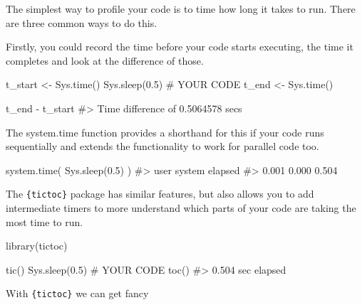 \documentclass[
  letterpaper,
  DIV=11,
  numbers=noendperiod]{scrreprt}
\newenvironment{Shaded}{\begin{snugshade}}{\end{snugshade}}
\newcommand{\CommentTok}[1]{\textcolor[rgb]{0.37,0.37,0.37}{#1}}
\newcommand{\FloatTok}[1]{\textcolor[rgb]{0.68,0.00,0.00}{#1}}
\newcommand{\FunctionTok}[1]{\textcolor[rgb]{0.28,0.35,0.67}{#1}}
\newcommand{\NormalTok}[1]{\textcolor[rgb]{0.00,0.23,0.31}{#1}}
\newcommand{\OtherTok}[1]{\textcolor[rgb]{0.00,0.23,0.31}{#1}}
\newcommand{\SpecialCharTok}[1]{\textcolor[rgb]{0.37,0.37,0.37}{#1}}
\begin{document}
The simplest way to profile your code is to time how long it takes to
run. There are three common ways to do this.

Firstly, you could record the time before your code starts executing,
the time it completes and look at the difference of those.

\begin{Shaded}
\begin{Highlighting}[]
\NormalTok{t\_start }\OtherTok{\textless{}{-}} \FunctionTok{Sys.time}\NormalTok{()}
\FunctionTok{Sys.sleep}\NormalTok{(}\FloatTok{0.5}\NormalTok{) }\CommentTok{\# YOUR CODE}
\NormalTok{t\_end }\OtherTok{\textless{}{-}} \FunctionTok{Sys.time}\NormalTok{()}

\NormalTok{t\_end }\SpecialCharTok{{-}}\NormalTok{ t\_start}
\CommentTok{\#\textgreater{} Time difference of 0.5064578 secs}
\end{Highlighting}
\end{Shaded}

The system.time function provides a shorthand for this if your code runs
sequentially and extends the functionality to work for parallel code
too.

\begin{Shaded}
\begin{Highlighting}[]
\FunctionTok{system.time}\NormalTok{(}
  \FunctionTok{Sys.sleep}\NormalTok{(}\FloatTok{0.5}\NormalTok{)}
\NormalTok{)}
\CommentTok{\#\textgreater{}    user  system elapsed }
\CommentTok{\#\textgreater{}   0.001   0.000   0.504}
\end{Highlighting}
\end{Shaded}

The \texttt{\{tictoc\}} package has similar features, but also allows
you to add intermediate timers to more understand which parts of your
code are taking the most time to run.

\begin{Shaded}
\begin{Highlighting}[]
\FunctionTok{library}\NormalTok{(tictoc)}

\FunctionTok{tic}\NormalTok{() }
\FunctionTok{Sys.sleep}\NormalTok{(}\FloatTok{0.5}\NormalTok{) }\CommentTok{\# YOUR CODE }
\FunctionTok{toc}\NormalTok{()}
\CommentTok{\#\textgreater{} 0.504 sec elapsed}
\end{Highlighting}
\end{Shaded}

With \texttt{\{tictoc\}} we can get fancy
\end{document}
